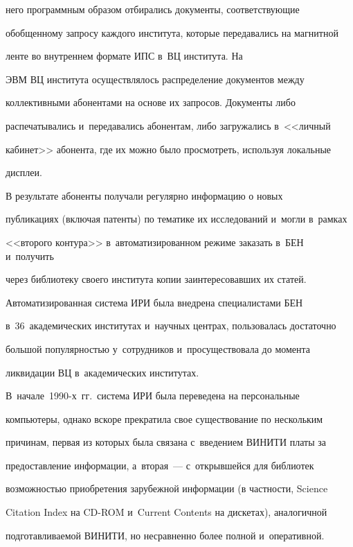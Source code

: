 него программным образом отбирались документы, соответствующие 


обобщенному запросу каждого института, которые передавались на магнитной 


ленте во внутреннем формате ИПС в~ВЦ института. На 


ЭВМ ВЦ института осуществлялось распределение документов между 


коллективными абонентами на основе их запросов. Документы либо 


распечатывались и~передавались абонентам, либо загружались в~<<личный 


кабинет>> абонента, где их можно было просмотреть, используя локальные 


дисплеи. 


  


  В результате абоненты получали регулярно информацию о новых 


публикациях (включая патенты) по тематике их исследований и~могли в~рамках 


<<второго контура>> в~автоматизированном режиме заказать в~БЕН и~получить 


через биб\-лио\-те\-ку своего института копии заинтересовавших их статей. 


  


  Автоматизированная система ИРИ была внедрена специалистами БЕН 


в~36~академических институтах и~научных центрах, пользовалась достаточно 


большой популярностью у~сотрудников и~просуществовала до момента 


ликвидации ВЦ в~академических институтах. 


В~начале~1990-х~гг.\ система ИРИ была переведена на персональные 


компьютеры, однако вскоре прекратила свое существование по нескольким 


причинам, первая из которых была связана с~введением ВИНИТИ платы за 


предоставление информации, а~вторая~--- с~открывшейся для библиотек 


возможностью приобретения зарубежной информации (в частности, Science 


Citation Index на CD-ROM и~Current Contents на дискетах), аналогичной 


подготавливаемой ВИНИТИ, но несравненно более полной и~оперативной. 


